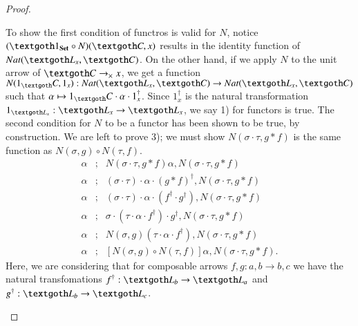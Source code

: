 \documentclass [12pt]{book}
\begin{document}
\begin{proof}
\begin{itemize}
To show the first condition of functros is valid for $N$, notice $(\textgoth1_\textbf{Set}\circ N)(\textgoth C,x)$ results in the identity function of $Nat(\textgoth L_x,\textgoth C)$. On the other hand, if we apply $N$ to the unit arrow of $\textgoth C\rightarrow_\times x$, we get a function $N(1_\textgoth C,1_x):Nat(\textgoth L_x,\textgoth C)\rightarrow Nat(\textgoth L_x,\textgoth C)$ such that $\alpha\mapsto1_\textgoth C\cdot\alpha\cdot1_x^\dagger$. Since $1_x^\dagger$ is the natural transformation $1_{\textgoth L_x}:\textgoth L_x\rightarrow\textgoth L_x$, we say 1) for functors is true. The second condition for $N$ to be a functor has been shown to be true, by construction. We are left to prove 3); we must show $N(\sigma\cdot\tau,g*f)$ is the same function as $N(\sigma,g)\circ N(\tau,f)$.\begin{eqnarray}\nonumber\alpha&;&N(\sigma\cdot\tau,g*f)\alpha,N(\sigma
\cdot\tau,g*f)\\\nonumber\alpha&;&(\sigma\cdot\tau)\cdot\alpha\cdot(g*f)^\dagger,
N(\sigma\cdot\tau,g*f)\\\nonumber\alpha&;&(\sigma\cdot\tau)\cdot\alpha\cdot
(f^\dagger\cdot g^\dagger),N(\sigma\cdot\tau,g*f)\\\nonumber\alpha&;&
\sigma\cdot(\tau\cdot\alpha\cdot f^\dagger)\cdot g^\dagger,N(\sigma\cdot\tau,g*f)
\\\nonumber\alpha&;&N(\sigma,g)(\tau\cdot\alpha\cdot f^\dagger),N(\sigma\cdot\tau,g*f)\\\nonumber\alpha&;&[N(\sigma,g)\circ N(\tau,f)]\alpha,N(\sigma\cdot\tau,g*f).\end{eqnarray}Here, we are considering that for composable arrows $f,g:a,b\rightarrow b,c$ we have the natural transfomations $f^\dagger:\textgoth L_b\rightarrow\textgoth L_a$ and $g^\dagger:\textgoth L_b\rightarrow\textgoth L_c$.


\end{itemize}
\end{proof}
\end{document}
